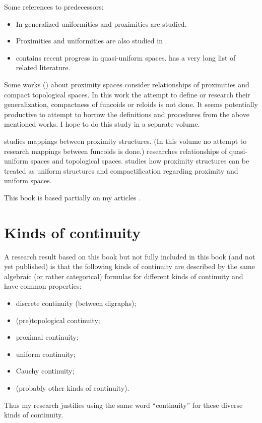 Some references to predecessors:
\begin{itemize}
\item In \cite{gen-prox-uni1,gen-prox-uni2,some-props-prox-genunif,prox-gen-unif,compl-unif-prox}
generalized uniformities and proximities are studied.
\item Proximities and uniformities are also studied in \cite{complete-prox,prox-not-compl,compl-prox-acad,compl-prox1,compl-prox2}.
\item \cite{qunif,qunif2001} contains recent progress in quasi-uniform
spaces. \cite{qunif2001} has a very long list of related literature.
\end{itemize}
Some works (\cite{on-proximity-spaces}) about proximity spaces consider
relationships of proximities and compact topological spaces. In this
work the attempt to define or research their generalization, compactness
of funcoids or reloids is not done. It seems potentially productive
to attempt to borrow the definitions and procedures from the above
mentioned works. I hope to do this study in a separate volume.

\cite{mapping-prox} studies mappings between proximity structures.
(In this volume no attempt to research mappings between funcoids is
done.) \cite{quasi-unif-top} researches relationships of quasi-uniform
spaces and topological spaces. \cite{eq-prox-totbound-unif} studies
how proximity structures can be treated as uniform structures and
compactification regarding proximity and uniform spaces.

This book is based partially on my articles \cite{filters,funcoidsreloids,pointfree}.


\section{Kinds of continuity}

A research result based on this book but not fully included in this
book (and not yet published) is that the following kinds of continuity
are described by the same algebraic (or rather categorical) formulas
for different kinds of continuity and have common properties:
\begin{itemize}
\item discrete continuity (between digraphs);
\item (pre)topological continuity;
\item proximal continuity;
\item uniform continuity;
\item Cauchy continuity;
\item (probably other kinds of continuity).
\end{itemize}
Thus my research justifies using the same word ``continuity'' for
these diverse kinds of continuity.

